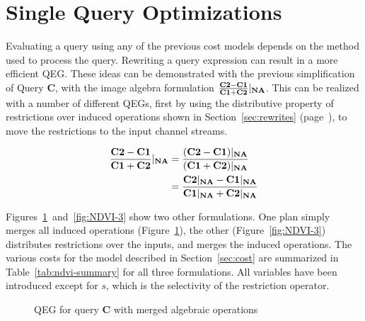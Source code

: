 \documentclass{ucdthesis}       %
\newcommand{\Tb}[2][]{ \TR[#1]{\psframebox{\rule{0pt}{9pt}#2}} }
\newcommand{\qry}[1]{{\bf #1}}
\begin{document}
\section{Single Query Optimizations}
\label{sec:single-opt}

Evaluating a query using any of the previous cost models depends on
the method used to process the query.  Rewriting a query expression
can result in a more efficient \ac{QEG}. These ideas can be
demonstrated with the previous simplification of Query \qry{C}, with
the image algebra formulation
$\frac{{\bf{C2}}-{\bf{C1}}}{{\bf{C1}}+{\bf{C2}}}|_{{\bf{NA}}} $.  This can be
realized with a number of different \acp{QEG}, first by using the
distributive property of restrictions over induced operations shown in
Section~\ref{sec:rewrites} (page~\pageref{sec:rewrites}), to move the
restrictions to the input channel streams.

\begin{align*}
\frac{{\bf{C2}}-{\bf{C1}}}{{\bf{C1}}+{\bf{C2}}}|_{{\bf{NA}}} &= \frac{({\bf{C2}}-{\bf{C1}})|_{{\bf{NA}}}}{({\bf{C1}}+{\bf{C2}})|_{{\bf{NA}}}} \\
&= \frac{{\bf{C2}}|_{{\bf{NA}}}-{\bf{C1}}|_{{\bf{NA}}}}{{\bf{C1}}|_{{\bf{NA}}}+{\bf{C2}}|_{{\bf{NA}}}}
\end{align*}

Figures~\ref{fig:NDVI-2}~and~\ref{fig:NDVI-3} show two other
formulations.  One plan simply merges all induced operations
(Figure~\ref{fig:NDVI-2}), the other (Figure~\ref{fig:NDVI-3})
distributes restrictions over the inputs, and merges the induced
operations.  The various costs for the model described in
Section~\ref{sec:cost} are summarized in Table~\ref{tab:ndvi-summary}
for all three formulations.  All variables have been introduced except
for $s$, which is the selectivity of the restriction operator.

\begin{figure}[htb]
  \centering
  \pstree[treemode=U,nodesep=2pt,levelsep=30pt]{\TR{Q}}{
    \pstree[treemode=U]{\Tb{$|_{NA}$}}{    
      \pstree[treemode=U]{\Tcircle{$f()$}}
      {
        \TR[name=C1]{\im{C1}}
        \TR[name=IR]{\im{C2}}
      }
    }
  }
  \quad
  
  \caption{\ac{QEG} for query \qry{C} with merged algebraic operations}
  \label{fig:NDVI-2}
\end{figure}
\end{document}
